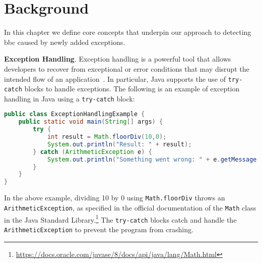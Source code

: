 \chapter{Background}\label{background}

In this chapter we define core concepts that underpin our approach to detecting
\gls{bbc} caused by newly added exceptions.

\textbf{Exception Handling}. Exception handling is a powerful tool that allows developers to recover from
exceptional or error conditions that may disrupt the intended flow of an application~\cite{Suman2016exception}.
In particular, Java supports the use of \texttt{try-catch} blocks to handle exceptions.
The following is an example of exception handling in Java using a \texttt{try-catch}
block:

\begin{lstlisting}[language=java]
public class ExceptionHandlingExample {
    public static void main(String[] args) {
        try {
            int result = Math.floorDiv(10,0);
            System.out.println("Result: " + result);
        } catch (ArithmeticException e) {
            System.out.println("Something went wrong: " + e.getMessage());
        }
    }
}
\end{lstlisting}

In the above example, dividing 10 by 0 using \texttt{Math.floorDiv} throws an
\texttt{ArithmeticException}, as specified in the official documentation of the
\texttt{Math} class in the Java Standard Library.\footnote{\url{https://docs.oracle.com/javase/8/docs/api/java/lang/Math.html}}
The \texttt{try-catch} blocks catch and handle the \texttt{ArithmeticException}
to prevent the program from crashing.



